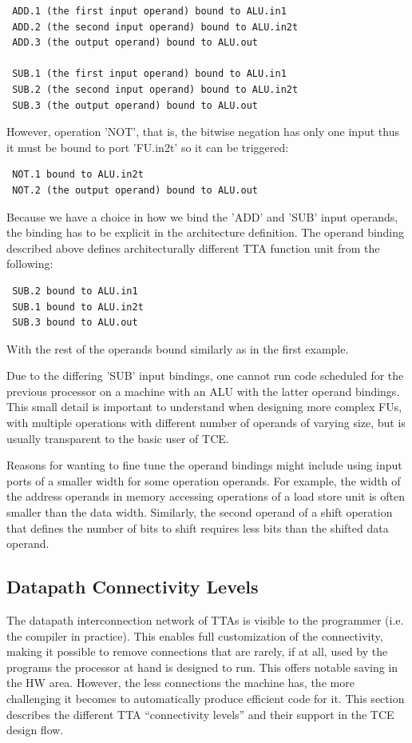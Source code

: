 \documentclass[twoside]{tceusermanual}
\begin{document}
\begin{verbatim}
 ADD.1 (the first input operand) bound to ALU.in1
 ADD.2 (the second input operand) bound to ALU.in2t
 ADD.3 (the output operand) bound to ALU.out

 SUB.1 (the first input operand) bound to ALU.in1
 SUB.2 (the second input operand) bound to ALU.in2t
 SUB.3 (the output operand) bound to ALU.out
\end{verbatim}

However, operation 'NOT', that is, the bitwise negation has only one input
thus it must be bound to port 'FU.in2t' so it can be triggered:

\begin{verbatim}
 NOT.1 bound to ALU.in2t
 NOT.2 (the output operand) bound to ALU.out
\end{verbatim}

Because we have a choice in how we bind the 'ADD' and 'SUB' input operands,
the binding has to be explicit in the architecture definition. The operand
binding described above defines architecturally different TTA function unit
from the following:

\begin{verbatim}
 SUB.2 bound to ALU.in1
 SUB.1 bound to ALU.in2t
 SUB.3 bound to ALU.out
\end{verbatim}

With the rest of the operands bound similarly as in the first example.

Due to the differing 'SUB' input bindings, one cannot run code scheduled
for the previous processor on a machine with an ALU with the latter 
operand bindings. This small detail is important to understand when 
designing more complex FUs, with multiple operations with different number of 
operands of varying size, but is usually transparent to the basic user of 
TCE.

Reasons for wanting to fine tune the operand bindings might include using
input ports of a smaller width for some operation operands. For example, the 
width of the address operands in memory accessing operations of a load store 
unit is often smaller than the data width. Similarly, the second operand of
a shift operation that defines the number of bits to shift requires less
bits than the shifted data operand.


\subsection{Datapath Connectivity Levels}
\label{ConnectivityLevels}
The datapath interconnection network of TTAs is visible to the
programmer (i.e. the compiler in practice).  This enables full
customization of the connectivity, making it possible to remove
connections that are rarely, if at all, used by the programs the
processor at hand is designed to run. This offers notable saving in
the HW area. However, the less connections the machine has, the more
challenging it becomes to automatically produce efficient code for
it. This section describes the different TTA ``connectivity levels''
and their support in the TCE design flow.
\end{document}
